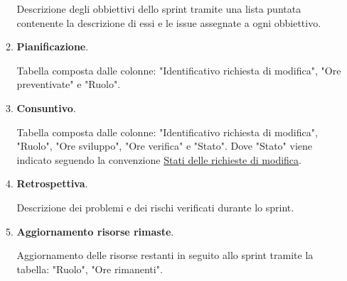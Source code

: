 \begin{enumerate}
\begin{enumerate}
        Descrizione degli obbiettivi dello sprint tramite una lista puntata contenente la descrizione di essi e le issue assegnate a ogni obbiettivo.
        \item \textbf{Pianificazione}.
        
        Tabella composta dalle colonne: "Identificativo richiesta di modifica", "Ore preventivate" e "Ruolo".

        \item \textbf{Consuntivo}.
        
        Tabella composta dalle colonne: "Identificativo richiesta di modifica", "Ruolo", "Ore sviluppo", "Ore verifica" e "Stato".
        Dove "Stato" viene indicato seguendo la convenzione \hyperref[par:stati]{Stati delle richieste di modifica}.
        
        \item \textbf{Retrospettiva}.
        
        Descrizione dei problemi e dei rischi verificati durante lo sprint.

        \item \textbf{Aggiornamento risorse rimaste}.
        
        Aggiornamento delle risorse restanti in seguito allo sprint tramite la tabella:
        "Ruolo", "Ore rimanenti".
        
    \end{enumerate}

\end{enumerate}